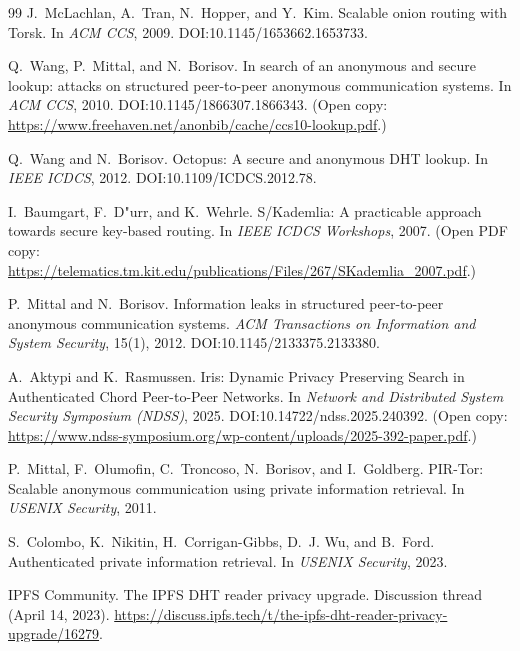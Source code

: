 \documentclass[11pt]{article}
\begin{document}
\begin{thebibliography}{99}
J.~McLachlan, A.~Tran, N.~Hopper, and Y.~Kim.
\newblock Scalable onion routing with Torsk.
\newblock In \emph{ACM CCS}, 2009.
\newblock DOI:10.1145/1653662.1653733.

Q.~Wang, P.~Mittal, and N.~Borisov.
\newblock In search of an anonymous and secure lookup: attacks on structured peer-to-peer anonymous communication systems.
\newblock In \emph{ACM CCS}, 2010.
\newblock DOI:10.1145/1866307.1866343. (Open copy: \url{https://www.freehaven.net/anonbib/cache/ccs10-lookup.pdf}.)


Q.~Wang and N.~Borisov.
\newblock Octopus: A secure and anonymous DHT lookup.
\newblock In \emph{IEEE ICDCS}, 2012.
\newblock DOI:10.1109/ICDCS.2012.78.

I.~Baumgart, F.~D{"u}rr, and K.~Wehrle.
\newblock S/Kademlia: A practicable approach towards secure key-based routing.
\newblock In \emph{IEEE ICDCS Workshops}, 2007.
\newblock (Open PDF copy: \url{https://telematics.tm.kit.edu/publications/Files/267/SKademlia_2007.pdf}.)

P.~Mittal and N.~Borisov.
\newblock Information leaks in structured peer-to-peer anonymous communication systems.
\newblock \emph{ACM Transactions on Information and System Security}, 15(1), 2012.
\newblock DOI:10.1145/2133375.2133380.

A.~Aktypi and K.~Rasmussen.
\newblock Iris: Dynamic Privacy Preserving Search in Authenticated Chord Peer-to-Peer Networks.
\newblock In \emph{Network and Distributed System Security Symposium (NDSS)}, 2025.
\newblock DOI:10.14722/ndss.2025.240392. (Open copy: \url{https://www.ndss-symposium.org/wp-content/uploads/2025-392-paper.pdf}.)

P.~Mittal, F.~Olumofin, C.~Troncoso, N.~Borisov, and I.~Goldberg.
\newblock PIR-Tor: Scalable anonymous communication using private information retrieval.
\newblock In \emph{USENIX Security}, 2011.

S.~Colombo, K.~Nikitin, H.~Corrigan-Gibbs, D.~J. Wu, and B.~Ford.
\newblock Authenticated private information retrieval.
\newblock In \emph{USENIX Security}, 2023.


IPFS Community.
\newblock The IPFS DHT reader privacy upgrade.
\newblock Discussion thread (April 14, 2023). \url{https://discuss.ipfs.tech/t/the-ipfs-dht-reader-privacy-upgrade/16279}.


\end{thebibliography}
\end{document}
